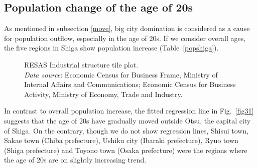 \documentclass[10pt, conference, compsocconf]{IEEEtran}
\begin{document}
\subsection{Population change of the age of 20s}\label{reg}
As mentioned in subsection \ref{move}, big city domination is considered as a cause 
for population outflow, especially in the age of 20s. If we consider overall ages, the five regions in Shiga show population increase (Table~\ref{popshiga}).
\begin{figure}[!t]
\centering
{}
\qquad
{}
\caption{RESAS Industrial structure tile plot.
\\{\it Data source}: Economic Census for Business Frame, Ministry of Internal Affairs and Communications;
 Economic Census for Business Activity, Ministry of Economy, Trade and Industry.
}\label{industry}
\end{figure}


In contrast to overall population increase, the fitted regression line in Fig.~\ref{fig31} suggests that the age of 20s have gradually moved outside Otsu, the capital city of Shiga.
On the contrary, though we do not show regression lines, 
 Shisui town, Sakae town (Chiba prefecture), Ushiku city (Ibaraki prefecture), Ryuo town (Shiga prefecture) and Toyono town (Osaka prefecture) were the regions where the age of 20s are on slightly increasing trend.
 
\end{document}

